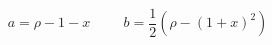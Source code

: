 \begin{displaymath}
 a = \rho -1 -x\hspace{1cm} b =\frac{1}{2}\left(\rho -(1+x)^2 \right) 
\end{displaymath}
